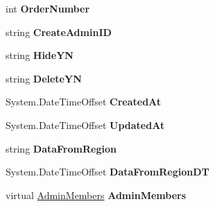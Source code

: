 \begin{DoxyCompactItemize}
\item 
int {\bfseries Order\+Number}\hypertarget{a00083_a69a79f36e0c84fb46b6925fa2c53991b}{}\label{a00083_a69a79f36e0c84fb46b6925fa2c53991b}

\item 
string {\bfseries Create\+Admin\+ID}\hypertarget{a00083_ae3b7bcf0af827ee47ff072bee0c3044e}{}\label{a00083_ae3b7bcf0af827ee47ff072bee0c3044e}

\item 
string {\bfseries Hide\+YN}\hypertarget{a00083_a07cbc66b5a561f383eb0dc82f0cc4e01}{}\label{a00083_a07cbc66b5a561f383eb0dc82f0cc4e01}

\item 
string {\bfseries Delete\+YN}\hypertarget{a00083_a0f567dc2d4084f8909cb77fdf5614e96}{}\label{a00083_a0f567dc2d4084f8909cb77fdf5614e96}

\item 
System.\+Date\+Time\+Offset {\bfseries Created\+At}\hypertarget{a00083_aa8947ff1d845fe39e64ef20d97cf0fa1}{}\label{a00083_aa8947ff1d845fe39e64ef20d97cf0fa1}

\item 
System.\+Date\+Time\+Offset {\bfseries Updated\+At}\hypertarget{a00083_a1ad4535ea6a538ab6d3cae8efc051aed}{}\label{a00083_a1ad4535ea6a538ab6d3cae8efc051aed}

\item 
string {\bfseries Data\+From\+Region}\hypertarget{a00083_ad6e800a3a836c34aa79ce07d828e2aad}{}\label{a00083_ad6e800a3a836c34aa79ce07d828e2aad}

\item 
System.\+Date\+Time\+Offset {\bfseries Data\+From\+Region\+DT}\hypertarget{a00083_a326e6da2aa52d310a5b5058312eec56b}{}\label{a00083_a326e6da2aa52d310a5b5058312eec56b}

\item 
virtual \hyperlink{a00012}{Admin\+Members} {\bfseries Admin\+Members}\hypertarget{a00083_a14704d01ea7e984a12f19cd12c85b9cf}{}\label{a00083_a14704d01ea7e984a12f19cd12c85b9cf}


\end{DoxyCompactItemize}
